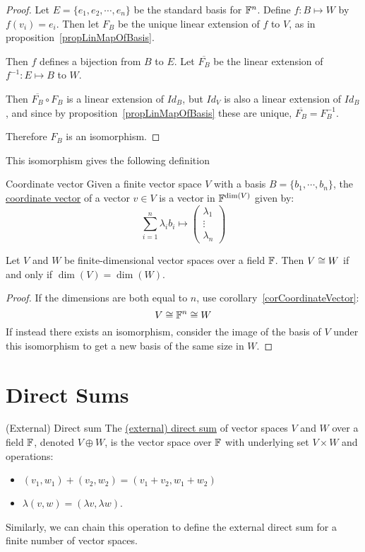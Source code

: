 \documentclass[../Main.tex]{subfiles}
\begin{document}
\begin{proof}
    Let $E = \{e_1, e_2, \cdots, e_n\}$ be the standard basis for $\mathbb{F}^n$. Define $f : B \mapsto W$ by $f(v_i) = e_i$. Then let $F_B$ be the unique linear extension of $f$ to $V$, as in proposition~\ref{propLinMapOfBasis}.

    Then $f$ defines a bijection from $B$ to $E$. Let $\overline{F_B}$ be the linear extension of $f^{-1} : E \mapsto B$ to $W$.

    Then $\overline{F_B} \circ F_B$ is a linear extension of $Id_B$, but $Id_V$ is also a linear extension of $Id_B$, and since by proposition~\ref{propLinMapOfBasis} these are unique, $\overline{F_B} = F_B^{-1}$.

    Therefore $F_B$ is an isomorphism.
\end{proof}
This isomorphism gives the following definition
\begin{definition}{Coordinate vector}
    Given a finite vector space $V$ with a basis $B = \{b_1, \cdots, b_n\}$, the\\\underline{coordinate vector} of a vector $v \in V$ is a vector in $\mathbb{F}^{\dim(V)}$ given by:
    \begin{equation*}
        \sum_{i=1}^n \lambda_i b_i \mapsto \begin{pmatrix} \lambda_1 \\ \vdots \\ \lambda_n \end{pmatrix}
    \end{equation*}
\end{definition}
\begin{corollary}
    Let $V$ and $W$ be finite-dimensional vector spaces over a field $\mathbb{F}$. Then $V \cong W$ if and only if $\dim(V) = \dim(W)$.
    \label{corIsomIffSameDim}
\end{corollary}
\begin{proof}
    If the dimensions are both equal to $n$, use corollary~\ref{corCoordinateVector}:
    \begin{equation*}
        V \cong \mathbb{F}^n \cong W
    \end{equation*}
    If instead there exists an isomorphism, consider the image of the basis of $V$ under this isomorphism to get a new basis of the same size in $W$.
\end{proof}
\section{Direct Sums}
\begin{definition}{(External) Direct sum}
    The \underline{(external) direct sum} of vector spaces $V$ and $W$ over a field $\mathbb{F}$, denoted $V \oplus W$, is the vector space over $\mathbb{F}$ with underlying set $V \times W$ and operations:
    \begin{itemize}
        \item $(v_1, w_1) + (v_2, w_2) = (v_1 + v_2, w_1 + w_2)$
        \item $\lambda(v, w) = (\lambda v, \lambda w)$.
    \end{itemize}
\end{definition}
Similarly, we can chain this operation to define the external direct sum for a finite number of vector spaces.
\end{document}
